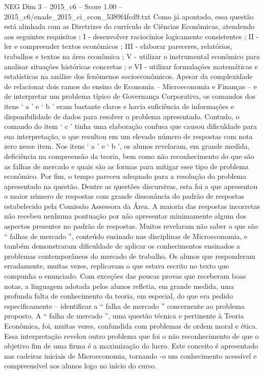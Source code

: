 \begin{textsample}{NEG Dim 3 – 2015\_c6 – Score 1.00 – 2015\_c6/enade\_2015\_ci\_econ\_5389f4fcd9.txt}
Como já apontado, essa questão está alinhada com as Diretrizes do currículo de Ciências Econômicas, atendendo aos seguintes requisitos : I - desenvolver raciocínios logicamente consistentes ; II - ler e compreender textos econômicos ; III - elaborar pareceres, relatórios, trabalhos e textos na área econômica ; V - utilizar o instrumental econômico para analisar situações históricas concretas ; e VI - utilizar formulações matemáticas e estatísticas na análise dos fenômenos socioeconômicos.
Apesar da complexidade de relacionar dois ramos do ensino de Economia – Microeconomia e Finanças – e de interpretar um problema típico de Governança Corporativa, os comandos dos itens ‘ a ’ e ‘ b ’ eram bastante claros e havia suficiência de informações e disponibilidade de dados para resolver o problema apresentado.
Contudo, o comando do item ‘ c ’ tinha uma elaboração confusa que causou dificuldade para sua interpretação, o que resultou em um elevado número de respostas com nota zero nesse item.
Nos itens ‘ a ’ e ‘ b ’, os alunos revelaram, em grande medida, deficiência na compreensão da teoria, bem como não reconhecimento do que são as falhas de mercado e quais são as formas para mitigar esse tipo de problema econômico.
Por fim, o tempo pareceu adequado para a resolução do problema apresentado na questão.
Dentre as questões discursivas, esta foi a que apresentou o maior número de respostas com grande dissonância do padrão de respostas estabelecido pela Comissão Assessora da Área.
A maioria das respostas incorretas não recebeu nenhuma pontuação por não apresentar minimamente algum dos aspectos presentes no padrão de respostas.
Muitos revelaram não saber o que são “ falhas de mercado ”, conteúdo ensinado nas disciplinas de Microeconomia, e também demonstraram dificuldade de aplicar os conhecimentos ensinados a problemas contemporâneos do mercado de trabalho.
Os alunos que responderam erradamente, muitas vezes, replicavam o que estava escrito no texto que compunha o enunciado.
Com exceções das poucas provas que receberam boas notas, a linguagem adotada pelos alunos refletia, em grande medida, uma profunda falta de conhecimento da teoria, em especial, do que era pedido especificamente – identificar a “ falha de mercado ” concernente ao problema proposto.
A “ falha de mercado ”, uma questão técnica e pertinente à Teoria Econômica, foi, muitas vezes, confundida com problemas de ordem moral e ética.
Essa interpretação revelou outro problema que foi o não reconhecimento de que o objetivo fim de uma firma é a maximização do lucro.
Este conceito é apresentado nas cadeiras iniciais de Microeconomia, tornando -o um conhecimento acessível e compreensível aos alunos logo no início do curso.

\end{textsample}
